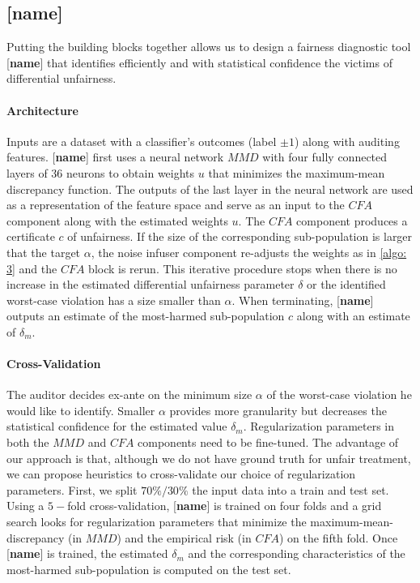 \documentclass{article}
\begin{document}
\subsection{[\textbf{name}]}
Putting the building blocks together allows us to design a fairness diagnostic tool  [\textbf{name}] that identifies efficiently and with statistical confidence the victims of differential unfairness.  

\paragraph{Architecture}
Inputs are a dataset with a classifier's outcomes (label $\pm 1$) along with auditing features. [\textbf{name}] first uses a neural network $MMD$ with four fully connected layers of $36$ neurons to obtain weights $u$ that minimizes the maximum-mean discrepancy function. The outputs of the last layer in the neural network are used as a representation of the feature space and serve as an input to the $CFA$ component along with the estimated weights $u$. The $CFA$ component produces a certificate $c$ of unfairness. If the size of the corresponding sub-population is larger that the target $\alpha$, the noise infuser component re-adjusts the weights as in \ref{algo: 3} and the $CFA$ block is rerun. This iterative procedure stops when there is no increase in the estimated differential unfairness parameter $\delta$ or the identified worst-case violation has a size smaller than $\alpha$. When terminating, [\textbf{name}] outputs an estimate of the most-harmed sub-population $c$ along with an estimate of $\delta_{m}$.




\paragraph{Cross-Validation}
The auditor decides ex-ante on the minimum size $\alpha$ of the worst-case violation he would like to identify. Smaller $\alpha$ provides more granularity but decreases the statistical confidence for the estimated value $\delta_{m}$. Regularization parameters in both the $MMD$ and $CFA$ components need to be fine-tuned. The advantage of our approach is that, although we do not have ground truth for unfair treatment, we can propose heuristics to cross-validate our choice of regularization parameters. First, we split $70\%/30\%$ the input data into a train and test set. Using a $5-$fold cross-validation, [\textbf{name}] is trained on four folds and a grid search looks for regularization parameters that minimize the maximum-mean-discrepancy (in $MMD$) and the empirical risk (in $CFA$) on the fifth fold. Once [\textbf{name}] is trained, the estimated $\delta_{m}$ and the corresponding characteristics of the most-harmed sub-population is computed on the test set.  
\end{document}
